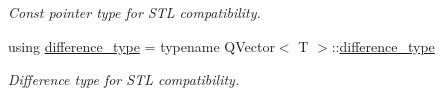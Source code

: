 \begin{DoxyCompactItemize}
\begin{DoxyCompactList}\small\item\em Const pointer type for S\+TL compatibility. \end{DoxyCompactList}\item 
using \hyperlink{class_mdt_1_1_plain_text_1_1_record_template_a28b5d1e32418df97716af8a89a22daad}{difference\+\_\+type} = typename Q\+Vector$<$ T $>$\+::\hyperlink{class_mdt_1_1_plain_text_1_1_record_template_a28b5d1e32418df97716af8a89a22daad}{difference\+\_\+type}\hypertarget{class_mdt_1_1_plain_text_1_1_record_template_a28b5d1e32418df97716af8a89a22daad}{}\label{class_mdt_1_1_plain_text_1_1_record_template_a28b5d1e32418df97716af8a89a22daad}

\begin{DoxyCompactList}\small\item\em Difference type for S\+TL compatibility. \end{DoxyCompactList}\end{DoxyCompactItemize}
